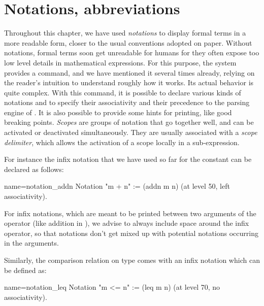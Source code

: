 \section{Notations, abbreviations}\label{sec:notabrev}

Throughout this chapter, we have used \emph{notations} to display
formal terms in a more readable form, closer to the usual conventions
adopted on paper. Without notations, formal terms soon get unreadable for
humans for they often expose too low level details in mathematical
expressions. For this purpose, the \Coq{} system provides a
 command, and we have mentioned it several times already,
relying on the reader's intuition to understand roughly how it
works. Its actual behavior is quite complex. With this command, it is
possible to declare various kinds of notations and to specify their
associativity and their precedence to the parsing engine of \Coq{}. It
is also possible to provide some hints for printing, like good
breaking points. {\em Scopes} are groups of notation that go together
well, and can be activated or deactivated simultaneously. They are
usually associated with a {\em scope delimiter}, which allows the
activation of a scope locally in a sub-expression.

For instance the infix notation that we have used so far for the
constant  can be declared as follows:

\begin{coq}{name=notation_addn}{}
Notation "m + n" := (addn m n) (at level 50, left associativity).
\end{coq}

For infix notations, which are meant to be printed between two arguments
of the operator (like addition in ), we advise to always include
space around the infix operator, so that notations don't get mixed up with
potential notations occurring in the arguments.


Similarly, the comparison relation  on type  comes with
an infix notation \C{<=} which can be defined as:

\begin{coq}{name=notation_leq}{}
Notation "m <= n" := (leq m n) (at level 70, no associativity).
\end{coq}

